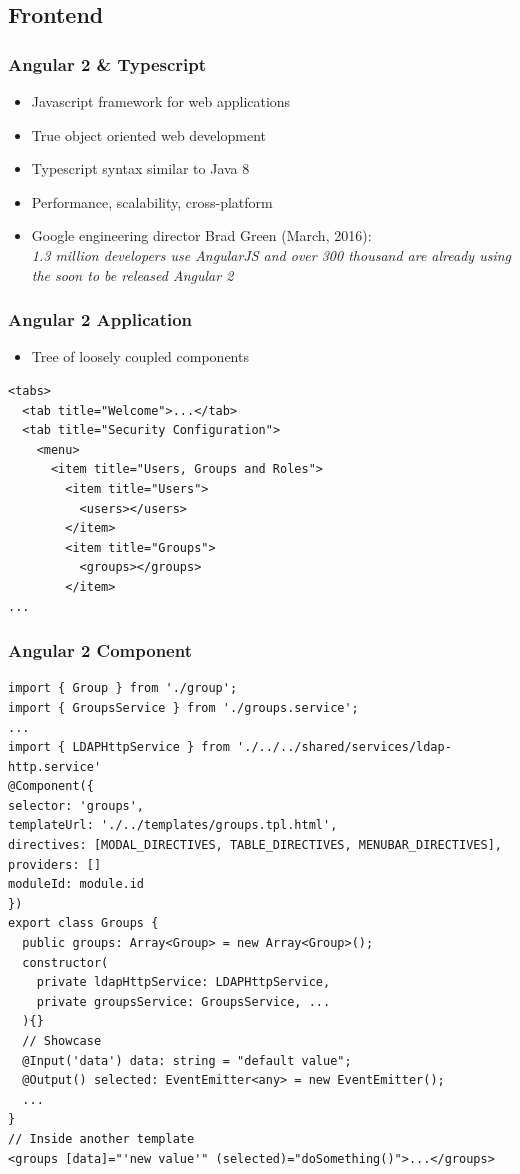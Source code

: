 \documentclass{beamer}
\begin{document}
\subsection{Frontend}

\begin{frame}
	\frametitle{Angular 2 \& Typescript}
	\begin{itemize}
		\item Javascript framework for web applications
		\item True object oriented web development
		\item Typescript syntax similar to Java 8
		\item Performance, scalability, cross-platform
		\item Google engineering director Brad Green (March, 2016):\\
		\emph{1.3 million developers use AngularJS and over 300 thousand are already using the soon to be released Angular 2}
	\end{itemize}
\end{frame}

\begin{frame}[fragile]
	\frametitle{Angular 2 Application}
	\begin{itemize}
		\item Tree of loosely coupled components
	\end{itemize}
	\begin{lstlisting}[frame=single]
<tabs>
  <tab title="Welcome">...</tab>
  <tab title="Security Configuration"> 
    <menu> 
      <item title="Users, Groups and Roles">
        <item title="Users">
          <users></users>
        </item>
        <item title="Groups">
          <groups></groups>
        </item>
...
	\end{lstlisting}
\end{frame}

\begin{frame}[fragile]
	\frametitle{Angular 2 Component}
	\lstset{%
		basicstyle=\tiny
	}
	\begin{lstlisting}[frame=single]
import { Group } from './group';
import { GroupsService } from './groups.service';
...
import { LDAPHttpService } from './../../shared/services/ldap-http.service'
@Component({
selector: 'groups',
templateUrl: './../templates/groups.tpl.html',
directives: [MODAL_DIRECTIVES, TABLE_DIRECTIVES, MENUBAR_DIRECTIVES],
providers: []
moduleId: module.id
})
export class Groups {
  public groups: Array<Group> = new Array<Group>();
  constructor(
    private ldapHttpService: LDAPHttpService,
    private groupsService: GroupsService, ...
  ){}
  // Showcase
  @Input('data') data: string = "default value";
  @Output() selected: EventEmitter<any> = new EventEmitter();
  ...
}
// Inside another template
<groups [data]="'new value'" (selected)="doSomething()">...</groups>
	\end{lstlisting}
\end{frame}
\end{document}
